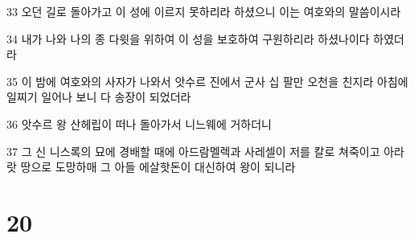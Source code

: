 \par 33 오던 길로 돌아가고 이 성에 이르지 못하리라 하셨으니 이는 여호와의 말씀이시라
\par 34 내가 나와 나의 종 다윗을 위하여 이 성을 보호하여 구원하리라 하셨나이다 하였더라
\par 35 이 밤에 여호와의 사자가 나와서 앗수르 진에서 군사 십 팔만 오천을 친지라 아침에 일찌기 일어나 보니 다 송장이 되었더라
\par 36 앗수르 왕 산헤립이 떠나 돌아가서 니느웨에 거하더니
\par 37 그 신 니스록의 묘에 경배할 때에 아드람멜렉과 사레셀이 저를 칼로 쳐죽이고 아라랏 땅으로 도망하매 그 아들 에살핫돈이 대신하여 왕이 되니라

\chapter{20}

